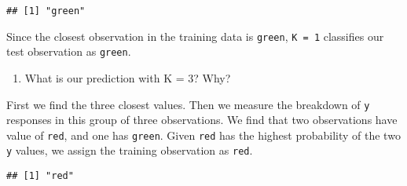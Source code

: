 \documentclass[]{book}
\newenvironment{Shaded}{\begin{snugshade}}{\end{snugshade}}
\newcommand{\KeywordTok}[1]{\textcolor[rgb]{0.13,0.29,0.53}{\textbf{#1}}}
\newcommand{\DataTypeTok}[1]{\textcolor[rgb]{0.13,0.29,0.53}{#1}}
\newcommand{\DecValTok}[1]{\textcolor[rgb]{0.00,0.00,0.81}{#1}}
\newcommand{\StringTok}[1]{\textcolor[rgb]{0.31,0.60,0.02}{#1}}
\newcommand{\OperatorTok}[1]{\textcolor[rgb]{0.81,0.36,0.00}{\textbf{#1}}}
\newcommand{\NormalTok}[1]{#1}
\providecommand{\tightlist}{%
  \setlength{\itemsep}{0pt}\setlength{\parskip}{0pt}}
\theoremstyle{definition}
\theoremstyle{definition}
\theoremstyle{definition}
\theoremstyle{remark}
\begin{document}
\begin{Shaded}
\end{Shaded}

\begin{verbatim}
## [1] "green"
\end{verbatim}

Since the closest observation in the training data is \texttt{green},
\texttt{K\ =\ 1} classifies our test observation as \texttt{green}.

\begin{enumerate}
\def\labelenumi{(\alph{enumi})}
\setcounter{enumi}{2}
\tightlist
\item
  What is our prediction with K = 3? Why?
\end{enumerate}

First we find the three closest values. Then we measure the breakdown of
\texttt{y} responses in this group of three observations. We find that
two observations have value of \texttt{red}, and one has \texttt{green}.
Given \texttt{red} has the highest probability of the two \texttt{y}
values, we assign the training observation as \texttt{red}.

\begin{Shaded}
\end{Shaded}

\begin{verbatim}
## [1] "red"
\end{verbatim}
\end{document}
